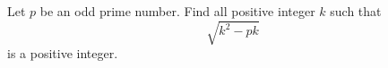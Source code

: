 Let $p$ be an odd prime number. Find all positive integer $k$ such that
$$\sqrt{k^2-pk}$$
is a positive integer.